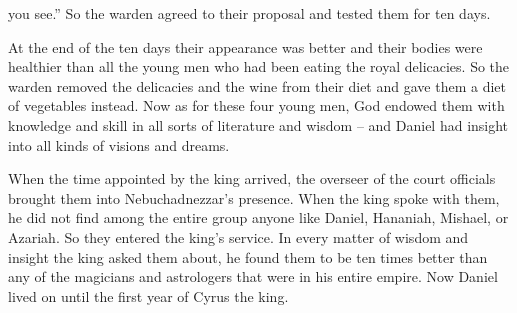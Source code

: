 {you see.”
So
the warden agreed
to their proposal
and tested
them for ten
days.
\par }{\PP {}At the end
of the ten
days
their appearance
was better
and their bodies were healthier
than
all
the young men
who had been eating
the royal
delicacies.
So
the warden
removed
the delicacies
and the wine
from their diet and gave
them a diet of vegetables instead.
Now as for these
four
young men,
God
endowed
them with knowledge and skill
in all
sorts of literature
and wisdom
– and Daniel
had insight
into all
kinds of visions
and dreams.
\par }{\PP {}When the time
appointed
by the king
arrived,
the overseer
of the court officials
brought
them into Nebuchadnezzar’s
presence.
When the king
spoke
with
them, he did not
find
among the entire
group anyone like Daniel,
Hananiah,
Mishael,
or Azariah.
So
they entered
the king’s service.
In every
matter
of wisdom
and insight
the king
asked them about, he found
them to be ten
times better
than any
of the magicians
and astrologers
that
were in his entire
empire.
Now
Daniel
lived on until
the first
year
of Cyrus
the king.

}
